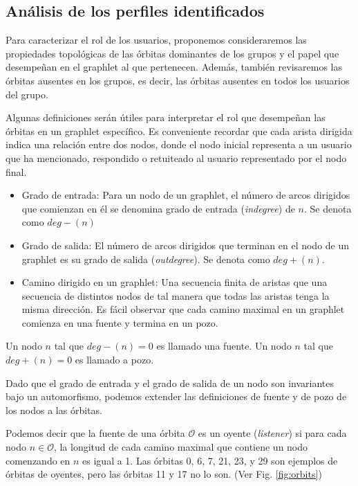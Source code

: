 \subsection{Análisis de los perfiles identificados}

Para caracterizar el rol de los usuarios, proponemos consideraremos las propiedades topológicas de las órbitas dominantes de los grupos y el papel que desempeñan en el graphlet al que pertenecen. Además, también revisaremos las órbitas ausentes en los grupos, es decir, las órbitas ausentes en todos los usuarios del grupo.

Algunas definiciones serán útiles para interpretar el rol que desempeñan las órbitas en un graphlet específico. Es conveniente recordar que cada arista dirigida indica una relación entre dos nodos, donde el nodo inicial representa a un usuario que ha mencionado, respondido o retuiteado al usuario representado por el nodo final. 

\begin{itemize}
    \item Grado de entrada: Para un nodo de un graphlet, el número de arcos dirigidos que comienzan en él se denomina grado de entrada (\textit{indegree}) de $n$. Se denota como $deg-(n)$
    \item Grado de salida: El número de arcos dirigidos que terminan en el nodo de un graphlet es su grado de salida (\textit{outdegree}). Se denota como $deg+(n)$.
    \item Camino dirigido en un graphlet: Una secuencia finita de aristas que una secuencia de distintos nodos de tal manera que todas las aristas tenga la misma dirección. Es fácil observar que cada camino maximal en un graphlet comienza en una fuente y termina en un pozo. %
\end{itemize}

Un nodo $n$ tal que $deg-(n)=0$ es llamado una fuente. Un nodo $n$ tal que $deg+(n)=0$ es llamado a pozo. 

Dado que el grado de entrada y el grado de salida de un nodo son invariantes bajo un automorfismo, podemos extender las definiciones de fuente y de pozo de los nodos a las órbitas. 

Podemos decir que la fuente de una órbita $\mathcal{O}$ es un oyente (\emph{listener}) si para cada nodo $n\in\mathcal{O}$, la longitud de cada camino maximal que contiene un nodo comenzando en $n$ es igual a 1. Las órbitas 0, 6, 7, 21, 23, y 29 son ejemplos de órbitas de oyentes, pero las órbitas 11 y 17 no lo son. (Ver Fig. \ref{fig:orbits})

